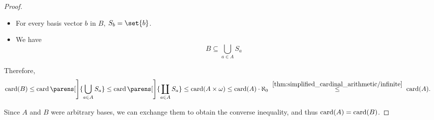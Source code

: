 \begin{proof}
\begin{itemize}
    \item For every basis vector \( b \) in \( B \), \( S_b = \set{ b } \).

    \item We have
    \begin{equation*}
      B \subseteq \bigcup_{a \in A} S_a
    \end{equation*}
  \end{itemize}

  Therefore,
  \begin{equation*}
    \card(B)
    \leq
    \card\parens[\Bigg]{ \bigcup_{a \in A} S_a }
    \leq
    \card\parens[\Bigg]{ \coprod_{a \in A} S_a }
    \leq
    \card(A \times \omega)
    \leq
    \card(A) \cdot \aleph_0
    \reloset {\ref{thm:simplified_cardinal_arithmetic/infinite}} \leq
    \card(A).
  \end{equation*}

  Since \( A \) and \( B \) were arbitrary bases, we can exchange them to obtain the converse inequality, and thus \( \operatorname{card}(A) = \operatorname{card}(B) \).
\end{proof}

